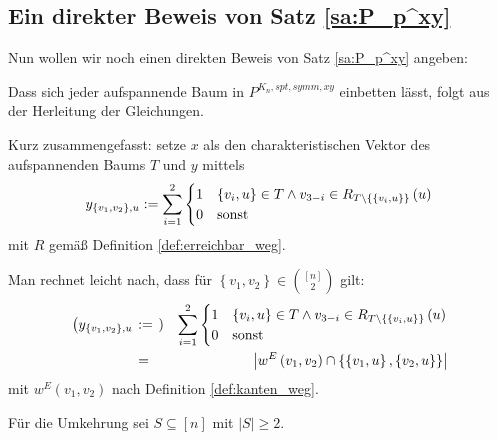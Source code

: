 \documentclass[10p,a4paper,BCOR = 12mm, DIV=15]{scrbook}
\begin{document}
\subsection{Ein direkter Beweis von Satz \ref{sa:P_p^xy}}

\label{sec:P_p^xy_direkt}

Nun wollen wir noch einen direkten Beweis von Satz \ref{sa:P_p^xy} angeben:

\begin{bew}
Dass sich jeder aufspannende Baum in $P^{K_n, spt, symm, xy}$ einbetten lässt, folgt aus der Herleitung der Gleichungen.

Kurz zusammengefasst: setze $x$ als den charakteristischen Vektor des aufspannenden Baums $T$ und $y$ mittels
\begin{displaymath}
y_{\left\{v_1, v_2\right\}, u} := \sum_{i=1}^2 \begin{cases}
1 & \left\{v_i, u\right\} \in T \wedge v_{3-i}\in R_{T\backslash \left\{\left\{v_i, u\right\}\right\}}\left(u\right) \\
0 & \textnormal{sonst}
\end{cases}
\end{displaymath}
mit $R$ gemäß Definition \ref{def:erreichbar_weg}.

\begin{Bem}
Man rechnet leicht nach, dass für $\left\{v_1, v_2\right\} \in {\left[n\right] \choose 2}$ gilt:
\begin{eqnarray*}
\left(y_{\left\{v_1, v_2\right\}, u} \right. & :=\left.\right) &  \sum_{i=1}^2 \begin{cases}
1 & \left\{v_i, u\right\} \in T \wedge v_{3-i}\in R_{T\backslash \left\{\left\{v_i, u\right\}\right\}}\left(u\right) \\
0 & \textnormal{sonst}
\end{cases} \\
& = & \left|w^E\left(v_1, v_2\right) \cap \left\{\left\{v_1, u\right\}, \left\{v_2, u\right\}\right\}\right|
\end{eqnarray*}
mit $w^E\left(v_1, v_2\right)$ nach Definition \ref{def:kanten_weg}.
\end{Bem}

Für die Umkehrung sei $S\subseteq \left[n\right]$ mit $\left|S\right| \geq 2$.


\end{bew}
\end{document}

